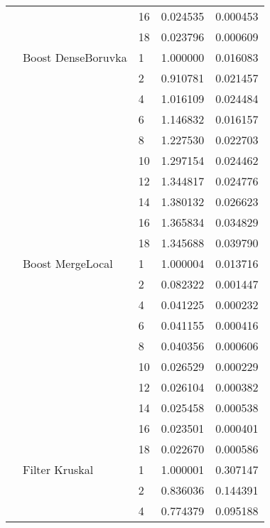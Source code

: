 \begin{tabular}{lllrr}
                      &            & 16 &  0.024535 &  0.000453 \\
                      &            & 18 &  0.023796 &  0.000609 \\
                      & Boost DenseBoruvka & 1  &  1.000000 &  0.016083 \\
                      &            & 2  &  0.910781 &  0.021457 \\
                      &            & 4  &  1.016109 &  0.024484 \\
                      &            & 6  &  1.146832 &  0.016157 \\
                      &            & 8  &  1.227530 &  0.022703 \\
                      &            & 10 &  1.297154 &  0.024462 \\
                      &            & 12 &  1.344817 &  0.024776 \\
                      &            & 14 &  1.380132 &  0.026623 \\
                      &            & 16 &  1.365834 &  0.034829 \\
                      &            & 18 &  1.345688 &  0.039790 \\
                      & Boost MergeLocal & 1  &  1.000004 &  0.013716 \\
                      &            & 2  &  0.082322 &  0.001447 \\
                      &            & 4  &  0.041225 &  0.000232 \\
                      &            & 6  &  0.041155 &  0.000416 \\
                      &            & 8  &  0.040356 &  0.000606 \\
                      &            & 10 &  0.026529 &  0.000229 \\
                      &            & 12 &  0.026104 &  0.000382 \\
                      &            & 14 &  0.025458 &  0.000538 \\
                      &            & 16 &  0.023501 &  0.000401 \\
                      &            & 18 &  0.022670 &  0.000586 \\
                      & Filter Kruskal & 1  &  1.000001 &  0.307147 \\
                      &            & 2  &  0.836036 &  0.144391 \\
                      &            & 4  &  0.774379 &  0.095188 \\

\end{tabular}

